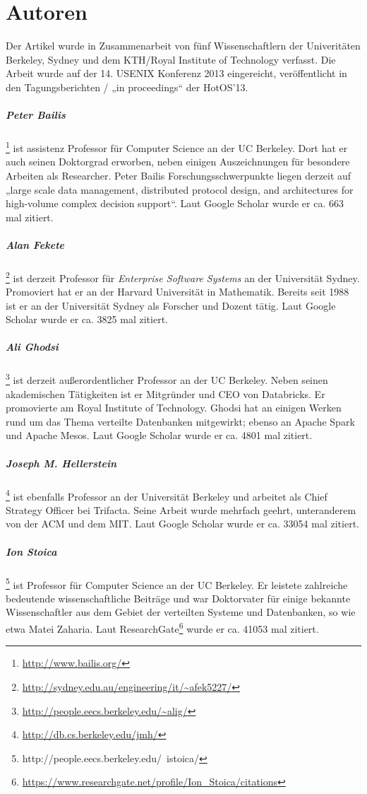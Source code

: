 \section{Autoren}

Der Artikel wurde in Zusammenarbeit von fünf Wissenschaftlern der Univeritäten Berkeley, Sydney und dem KTH/Royal Institute of Technology verfasst. Die Arbeit wurde auf der 14. USENIX Konferenz 2013 eingereicht, veröffentlicht in den Tagungsberichten / „in proceedings“ der HotOS'13.

\subparagraph{Peter Bailis}\footnote{\url{http://www.bailis.org/}}
ist assistenz Professor für Computer Science an der UC Berkeley. Dort hat er auch seinen Doktorgrad erworben, neben einigen Auszeichnungen für besondere Arbeiten als Researcher. Peter Bailis Forschungsschwerpunkte liegen derzeit auf „large scale data management, distributed protocol design, and architectures for high-volume complex decision support“. Laut Google Scholar wurde er ca. 663 mal zitiert.

\subparagraph{Alan Fekete}\footnote{\url{http://sydney.edu.au/engineering/it/~afek5227/}}
ist derzeit Professor für \textit{Enterprise Software Systems} an der Universität Sydney. Promoviert hat er an der Harvard Universität in Mathematik. Bereits seit 1988 ist er an der Universität Sydney als Forscher und Dozent tätig. Laut Google Scholar wurde er ca. 3825 mal zitiert.

\subparagraph{Ali Ghodsi}\footnote{\url{http://people.eecs.berkeley.edu/~alig/}}
ist derzeit außerordentlicher Professor an der UC Berkeley. Neben seinen akademischen Tätigkeiten ist er Mitgründer und CEO von Databricks. Er promovierte am Royal Institute of Technology. Ghodsi hat an einigen Werken rund um das Thema verteilte Datenbanken mitgewirkt; ebenso an Apache Spark und Apache Mesos.  
Laut Google Scholar wurde er ca. 4801 mal zitiert.

\subparagraph{Joseph M. Hellerstein}\footnote{\url{http://db.cs.berkeley.edu/jmh/}}
ist ebenfalls Professor an der Universität Berkeley und arbeitet als Chief Strategy Officer bei Trifacta. Seine Arbeit wurde mehrfach geehrt, unteranderem von der ACM und dem MIT. Laut Google Scholar wurde er ca. 33054 mal zitiert.

\subparagraph{Ion Stoica} \footnote{http://people.eecs.berkeley.edu/~istoica/} ist Professor für Computer Science an der UC Berkeley. Er leistete zahlreiche bedeutende wissenschaftliche Beiträge und war Doktorvater für einige bekannte Wissenschaftler aus dem Gebiet der verteilten Systeme und Datenbanken, so wie etwa Matei Zaharia. Laut ResearchGate\footnote{\url{https://www.researchgate.net/profile/Ion_Stoica/citations}} wurde er ca. 41053 mal zitiert.